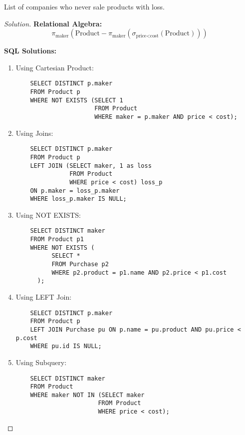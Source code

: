 \documentclass[10pt]{article}
\newenvironment{problem}[2][Problem]{\begin{trivlist}
\item[\hskip \labelsep {\bfseries #1}\hskip \labelsep {\bfseries #2.}]}{\end{trivlist}}
\begin{document}
\begin{problem}{9}
List of companies who never sale products with loss.
\end{problem}

\begin{proof}[Solution]
\textbf{Relational Algebra:}
\[
\pi_{\text{maker}}\left(\text{Product} - \pi_{\text{maker}}\left(\sigma_{\text{price} < \text{cost}}(\text{Product})\right)\right)
\]

\textbf{SQL Solutions:}
\begin{enumerate}
    \item Using Cartesian Product:
    \begin{verbatim}
    SELECT DISTINCT p.maker
    FROM Product p
    WHERE NOT EXISTS (SELECT 1
                      FROM Product
                      WHERE maker = p.maker AND price < cost);
    \end{verbatim}
    
    \item Using Joins:
    \begin{verbatim}
    SELECT DISTINCT p.maker
    FROM Product p
    LEFT JOIN (SELECT maker, 1 as loss
               FROM Product
               WHERE price < cost) loss_p
    ON p.maker = loss_p.maker
    WHERE loss_p.maker IS NULL;
    \end{verbatim}

    \item Using NOT EXISTS:
    \begin{verbatim}
    SELECT DISTINCT maker
    FROM Product p1
    WHERE NOT EXISTS (
          SELECT *
          FROM Purchase p2
          WHERE p2.product = p1.name AND p2.price < p1.cost
      );
    \end{verbatim}

    \item Using LEFT Join:
    \begin{verbatim}
    SELECT DISTINCT p.maker
    FROM Product p
    LEFT JOIN Purchase pu ON p.name = pu.product AND pu.price < p.cost
    WHERE pu.id IS NULL;
    \end{verbatim}
    
    \item Using Subquery:
    \begin{verbatim}
    SELECT DISTINCT maker
    FROM Product
    WHERE maker NOT IN (SELECT maker
                       FROM Product
                       WHERE price < cost);
    \end{verbatim}
\end{enumerate}
\end{proof}
\end{document}
